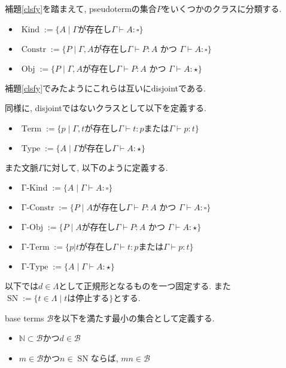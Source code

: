 \documentclass[12pt, titlepage]{ltjsarticle}
\DeclareMathOperator{\SN}{SN}
\DeclareMathOperator{\Term}{Term}
\DeclareMathOperator{\Obj}{Obj}
\DeclareMathOperator{\Constr}{Constr}
\DeclareMathOperator{\Type}{Type}
\DeclareMathOperator{\Kind}{Kind}
\DeclareMathOperator{\GTerm}{\Gamma-Term}
\DeclareMathOperator{\GObj}{\Gamma-Obj}
\DeclareMathOperator{\GConstr}{\Gamma-Constr}
\DeclareMathOperator{\GType}{\Gamma-Type}
\DeclareMathOperator{\GKind}{\Gamma-Kind}
\begin{document}
\begin{defn}
補題\ref{clsfy}を踏まえて, pseudotermの集合$P$をいくつかのクラスに分類する.
 \begin{itemize}
  \item $\Kind := \{ A \mid \Gamma \text{が存在し} \Gamma \vdash A \colon {\square}\}$
  \item $\Constr := \{ P \mid \Gamma, A \text{が存在し} \Gamma \vdash P \colon A \text{ かつ } \Gamma \vdash A \colon {\square}\}$
  \item $\Obj := \{ P \mid \Gamma, A \text{が存在し} \Gamma \vdash P \colon A \text{ かつ } \Gamma \vdash A \colon {\star}\}$
 \end{itemize}
 補題\ref{clsfy}でみたようにこれらは互いにdisjointである.

 同様に, disjointではないクラスとして以下を定義する.
 \begin{itemize}
  \item $\Term := \{p \mid \Gamma, t \text {が存在し} \Gamma \vdash t : p \text{または} \Gamma \vdash p : t \}$
  \item $\Type := \{ A \mid \Gamma \text{が存在し} \Gamma \vdash A \colon {\star}\}$
 \end{itemize}

また文脈$\Gamma$に対して, 以下のように定義する.
 \begin{itemize}
  \item $\GKind := \{ A \mid \Gamma \vdash A \colon {\square}\}$
  \item $\GConstr := \{ P \mid A \text{が存在し} \Gamma \vdash P \colon A \text{ かつ } \Gamma \vdash A \colon {\square}\}$
  \item $\GObj := \{ P \mid A \text{が存在し} \Gamma \vdash P \colon A \text{ かつ } \Gamma \vdash A \colon {\star}\}$
  \item $\GTerm := \{p | t \text {が存在し} \Gamma \vdash t : p \text{または} \Gamma \vdash p : t \}$
  \item $\GType := \{ A \mid \Gamma \vdash A \colon {\star}\}$
 \end{itemize}
\end{defn}

以下では$d \in \Lambda$として正規形となるものを一つ固定する. また$\SN := \{ t \in \Lambda \mid t \text{は停止する}\}$とする.

\begin{defn}
 base terms $\mathcal{B}$を以下を満たす最小の集合として定義する.
 \begin{itemize}
  \item $\mathbb{N} \subset \mathcal{B}$かつ$d \in \mathcal{B}$
  \item $m \in \mathcal{B}$かつ$n \in \SN$ならば, $mn \in \mathcal{B}$
 \end{itemize}
\end{defn}
\end{document}
